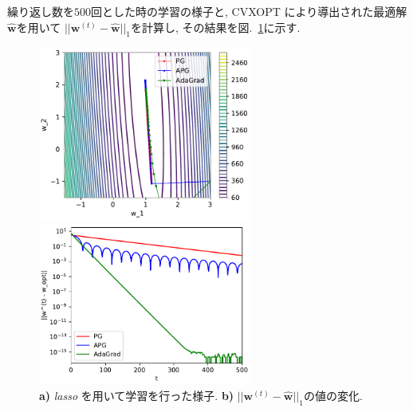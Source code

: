 \documentclass[a4paper,10pt]{jsarticle}
\begin{document}
繰り返し数を$500$回とした時の学習の様子と,
CVXOPT により導出された最適解$\hat{\bm{w}}$を用いて
$||\bm{w}^{(t)} - \hat{\bm{w}}||_1$を計算し,
その結果を図.~\ref{img:lasso-adagrad}に示す.
\begin{figure}[htbp]
 \begin{minipage}{0.5\hsize}
  \begin{center}
   \includegraphics[width=7cm]{figs/p2_lasso_result_pg-apg-adagrad.pdf}
  \end{center}
  \vspace{-0.5cm}
  \subcaption{}
 \end{minipage}
 \begin{minipage}{0.5\hsize}
  \begin{center}
   \includegraphics[width=7cm]{figs/p2_lasso_dist_adagrad.pdf}
  \end{center}
  \vspace{-0.5cm}
  \subcaption{}
 \end{minipage}
 \caption{\textbf{a)} \textit{lasso} を用いて学習を行った様子.
 \textbf{b)} $||\bm{w}^{(t)} - \hat{\bm{w}}||_1$の値の変化.
 }
 \label{img:lasso-adagrad}
\end{figure}
\end{document}
